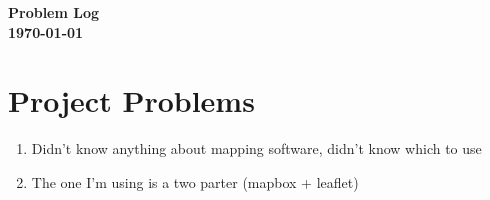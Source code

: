 \documentclass[a4paper,twoside,notitlepage,11pt]{article}
\begin{document}
\pagestyle{empty}
\begin{center}
 {\LARGE \textbf{Problem Log} \\ [0.2cm]}
	 \textbf{\today}
\end{center}

\section{Project Problems}
\begin{enumerate}
\item Didn't know anything about mapping software, didn't know which to use
\item The one I'm using is a two parter (mapbox + leaflet)
\end{enumerate}
\end{document}
